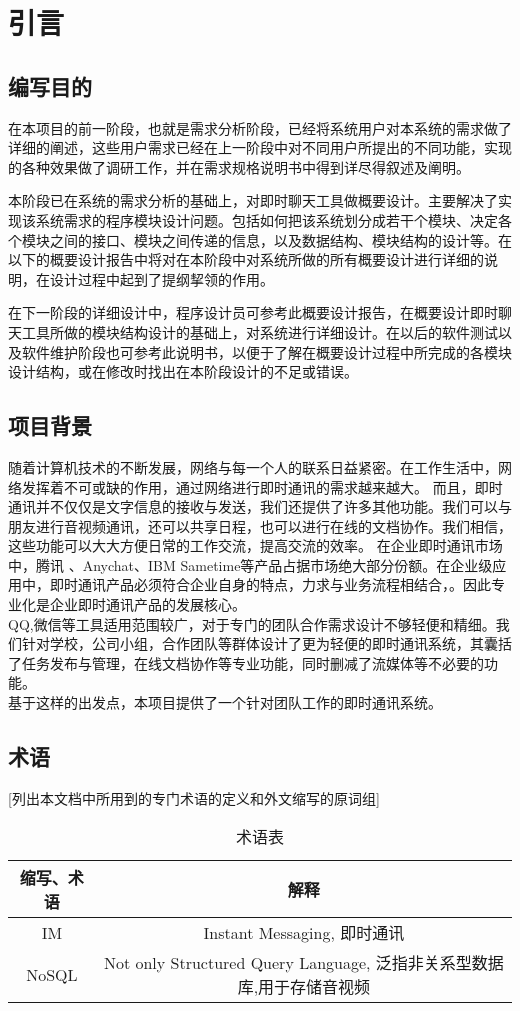 \chapter{引言}

\section{编写目的}
在本项目的前一阶段，也就是需求分析阶段，已经将系统用户对本系统的需求做了详细的阐述，这些用户需求已经在上一阶段中对不同用户所提出的不同功能，实现的各种效果做了调研工作，并在需求规格说明书中得到详尽得叙述及阐明。

本阶段已在系统的需求分析的基础上，对即时聊天工具做概要设计。主要解决了实现该系统需求的程序模块设计问题。包括如何把该系统划分成若干个模块、决定各个模块之间的接口、模块之间传递的信息，以及数据结构、模块结构的设计等。在以下的概要设计报告中将对在本阶段中对系统所做的所有概要设计进行详细的说明，在设计过程中起到了提纲挈领的作用。

在下一阶段的详细设计中，程序设计员可参考此概要设计报告，在概要设计即时聊天工具所做的模块结构设计的基础上，对系统进行详细设计。在以后的软件测试以及软件维护阶段也可参考此说明书，以便于了解在概要设计过程中所完成的各模块设计结构，或在修改时找出在本阶段设计的不足或错误。


\section{项目背景}

随着计算机技术的不断发展，网络与每一个人的联系日益紧密。在工作生活中，网络发挥着不可或缺的作用，通过网络进行即时通讯的需求越来越大。
而且，即时通讯并不仅仅是文字信息的接收与发送，我们还提供了许多其他功能。我们可以与朋友进行音视频通讯，还可以共享日程，也可以进行在线的文档协作。我们相信，这些功能可以大大方便日常的工作交流，提高交流的效率。
在企业即时通讯市场中，腾讯 、Anychat、IBM Sametime等产品占据市场绝大部分份额。在企业级应用中，即时通讯产品必须符合企业自身的特点，力求与业务流程相结合，。因此专业化是企业即时通讯产品的发展核心。\\ QQ,微信等工具适用范围较广，对于专门的团队合作需求设计不够轻便和精细。我们针对学校，公司小组，合作团队等群体设计了更为轻便的即时通讯系统，其囊括了任务发布与管理，在线文档协作等专业功能，同时删减了流媒体等不必要的功能。\\
基于这样的出发点，本项目提供了一个针对团队工作的即时通讯系统。

\section{术语}
[列出本文档中所用到的专门术语的定义和外文缩写的原词组]

\begin{table}[htbp]
\centering
\caption{术语表} \label{tab:terminology}
\begin{tabular}{|c|c|}
    \hline
    缩写、术语 & 解释 \\
     \hline
      IM & Instant Messaging, 即时通讯 \\
     \hline
      NoSQL & Not only Structured Query Language, 泛指非关系型数据库,用于存储音视频 \\
     \hline
 \end{tabular}
 \end{table}